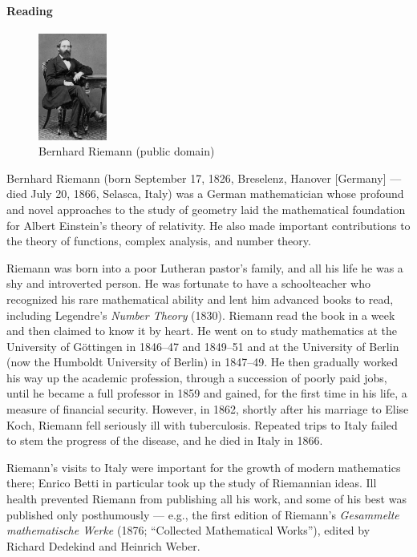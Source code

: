 \paragraph{Reading}
\begin{figure}
  \centering
  \includegraphics[width=0.2\textwidth]{riemann}
  \caption{Bernhard Riemann (public domain)}
\end{figure}
Bernhard Riemann (born September 17, 1826, Breselenz, Hanover [Germany] --- died July 20, 1866, Selasca, Italy) was a German mathematician whose profound and novel approaches to the study of geometry laid the mathematical foundation for Albert Einstein's theory of relativity. He also made important contributions to the theory of functions, complex analysis, and number theory.

Riemann was born into a poor Lutheran pastor's family, and all his life he was a shy and introverted person. He was fortunate to have a schoolteacher who recognized his rare mathematical ability and lent him advanced books to read, including Legendre's \textit{Number Theory} (1830). Riemann read the book in a week and then claimed to know it by heart. He went on to study mathematics at the University of Göttingen in 1846--47 and 1849--51 and at the University of Berlin (now the Humboldt University of Berlin) in 1847--49. He then gradually worked his way up the academic profession, through a succession of poorly paid jobs, until he became a full professor in 1859 and gained, for the first time in his life, a measure of financial security. However, in 1862, shortly after his marriage to Elise Koch, Riemann fell seriously ill with tuberculosis. Repeated trips to Italy failed to stem the progress of the disease, and he died in Italy in 1866.

Riemann's visits to Italy were important for the growth of modern mathematics there; Enrico Betti in particular took up the study of Riemannian ideas. Ill health prevented Riemann from publishing all his work, and some of his best was published only posthumously --- e.g., the first edition of Riemann's \textit{Gesammelte mathematische Werke} (1876; ``Collected Mathematical Works''), edited by Richard Dedekind and Heinrich Weber.

